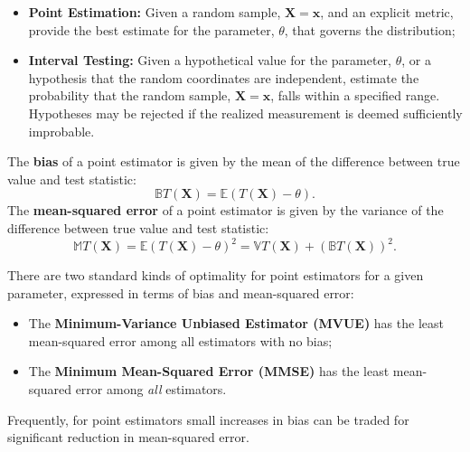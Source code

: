 \documentclass[12pt, twoside, draft]{article}
\begin{document}
\begin{itemize}
\item \textbf{Point Estimation: } Given a random sample, $\mathbf{X} = \mathbf{x}$, and an explicit metric, provide the best estimate for the parameter, $\theta$, that governs the distribution; 
\item \textbf{Interval Testing:} Given a hypothetical value for the parameter, $\theta$, or a hypothesis that the random coordinates are independent, estimate the probability that the random sample, $\mathbf{X} = \mathbf{x}$, falls within a specified range.  Hypotheses may be rejected if the realized measurement is deemed sufficiently improbable.
\end{itemize}

The \textbf{bias} of a point estimator is given by the mean of the difference between true value and test statistic:
\begin{equation}
\mathbb{B} T(\mathbf{X}) = \mathbb{E} \left( T(\mathbf{X}) - \theta \right).
\end{equation}
The \textbf{mean-squared error} of a point estimator is given by the variance of the difference between true value and test statistic:
\begin{equation}
\mathbb{M} T(\mathbf{X}) = \mathbb{E} \left( T(\mathbf{X}) - \theta \right)^2 = \mathbb{V}T(\mathbf{X}) + (\mathbb{B} T(\mathbf{X}))^2.
\end{equation}

There are two standard kinds of optimality for point estimators for a given parameter, expressed in terms of bias and mean-squared error:
\begin{itemize}
\item The \textbf{Minimum-Variance Unbiased Estimator (MVUE)} has the least mean-squared error among all estimators with no bias;
\item The \textbf{Minimum Mean-Squared Error (MMSE)} has the least mean-squared error among \textit{all} estimators.
\end{itemize}
Frequently, for point estimators small increases in bias can be traded for significant reduction in mean-squared error.
\end{document}
